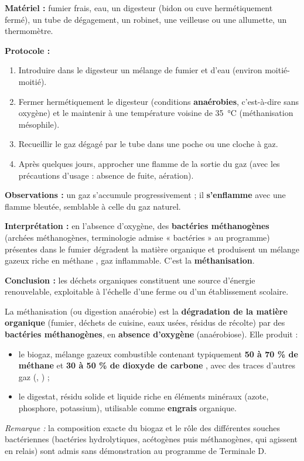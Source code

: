 \documentclass[11pt]{article}
\newcommand{\cle}[1]{{\popxbold\color{popdark}#1}}
\begin{document}
\begin{experience}
\textbf{Matériel :} fumier frais, eau, un digesteur (bidon ou cuve hermétiquement fermé), un tube de dégagement, un robinet, une veilleuse ou une allumette, un thermomètre.\par
\textbf{Protocole :}
\begin{enumerate}
\item Introduire dans le digesteur un mélange de fumier et d'eau (environ moitié-moitié).
\item Fermer hermétiquement le digesteur (conditions \textbf{anaérobies}, c'est-à-dire sans oxygène) et le maintenir à une température voisine de \SI{35}{\celsius} (méthanisation mésophile).
\item Recueillir le gaz dégagé par le tube dans une poche ou une cloche à gaz.
\item Après quelques jours, approcher une flamme de la sortie du gaz (avec les précautions d'usage : absence de fuite, aération).
\end{enumerate}
\textbf{Observations :} un gaz s'accumule progressivement ; il \textbf{s'enflamme} avec une flamme bleutée, semblable à celle du gaz naturel.\par
\textbf{Interprétation :} en l'absence d'oxygène, des \textbf{bactéries méthanogènes} (archées méthanogènes, terminologie admise « bactéries » au programme) présentes dans le fumier dégradent la matière organique et produisent un mélange gazeux riche en \cle{méthane} , gaz inflammable. C'est la \textbf{méthanisation}.\par
\textbf{Conclusion :} les déchets organiques constituent une source d'énergie renouvelable, exploitable à l'échelle d'une ferme ou d'un établissement scolaire.
\end{experience}

\begin{definition}[Méthanisation]
La \cle{méthanisation} (ou digestion anaérobie) est la \textbf{dégradation de la matière organique} (fumier, déchets de cuisine, eaux usées, résidus de récolte) par des \textbf{bactéries méthanogènes}, en \textbf{absence d'oxygène} (anaérobiose). Elle produit :
\begin{itemize}
\item le \cle{biogaz}, mélange gazeux combustible contenant typiquement \textbf{50 à 70 \% de méthane}  et \textbf{30 à 50 \% de dioxyde de carbone} , avec des traces d'autres gaz (, ) ;
\item le \cle{digestat}, résidu solide et liquide riche en éléments minéraux (azote, phosphore, potassium), utilisable comme \textbf{engrais} organique.
\end{itemize}
\emph{Remarque :} la composition exacte du biogaz et le rôle des différentes souches bactériennes (bactéries hydrolytiques, acétogènes puis méthanogènes, qui agissent en relais) sont admis sans démonstration au programme de Terminale D.
\end{definition}
\end{document}
